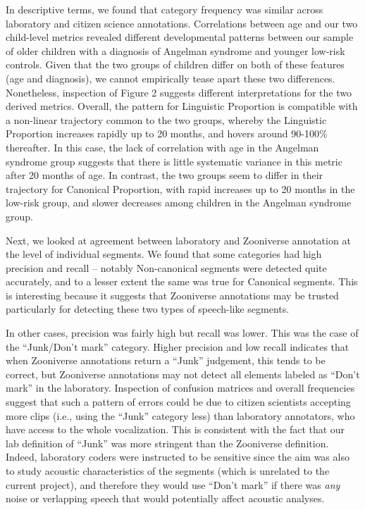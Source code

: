 \documentclass[english,,man]{apa6}
\begin{document}
In descriptive terms, we found that category frequency was similar across laboratory and citizen science annotations. Correlations between age and our two child-level metrics revealed different developmental patterns between our sample of older children with a diagnosis of Angelman syndrome and younger low-risk controls. Given that the two groups of children differ on both of these features (age and diagnosis), we cannot empirically tease apart these two differences. Nonetheless, inspection of Figure 2 suggests different interpretations for the two derived metrics. Overall, the pattern for Linguistic Proportion is compatible with a non-linear trajectory common to the two groups, whereby the Linguistic Proportion increases rapidly up to 20 months, and hovers around 90-100\% thereafter. In this case, the lack of correlation with age in the Angelman syndrome group suggests that there is little systematic variance in this metric after 20 months of age. In contrast, the two groups seem to differ in their trajectory for Canonical Proportion, with rapid increases up to 20 months in the low-risk group, and slower decreases among children in the Angelman syndrome group.

Next, we looked at agreement between laboratory and Zooniverse annotation at the level of individual segments. We found that some categories had high precision and recall -- notably Non-canonical segments were detected quite accurately, and to a lesser extent the same was true for Canonical segments. This is interesting because it suggests that Zooniverse annotations may be trusted particularly for detecting these two types of speech-like segments.

In other cases, precision was fairly high but recall was lower. This was the case of the \enquote{Junk/Don't mark} category. Higher precision and low recall indicates that when Zooniverse annotations return a \enquote{Junk} judgement, this tends to be correct, but Zooniverse annotations may not detect all elements labeled as \enquote{Don't mark} in the laboratory. Inspection of confusion matrices and overall frequencies suggest that such a pattern of errors could be due to citizen scientists accepting more clips (i.e., using the \enquote{Junk} category less) than laboratory annotators, who have access to the whole vocalization. This is consistent with the fact that our lab definition of \enquote{Junk} was more stringent than the Zooniverse definition. Indeed, laboratory coders were instructed to be sensitive since the aim was also to study acoustic characteristics of the segments (which is unrelated to the current project), and therefore they would use \enquote{Don't mark} if there was \emph{any} noise or verlapping speech that would potentially affect acoustic analyses.
\end{document}
